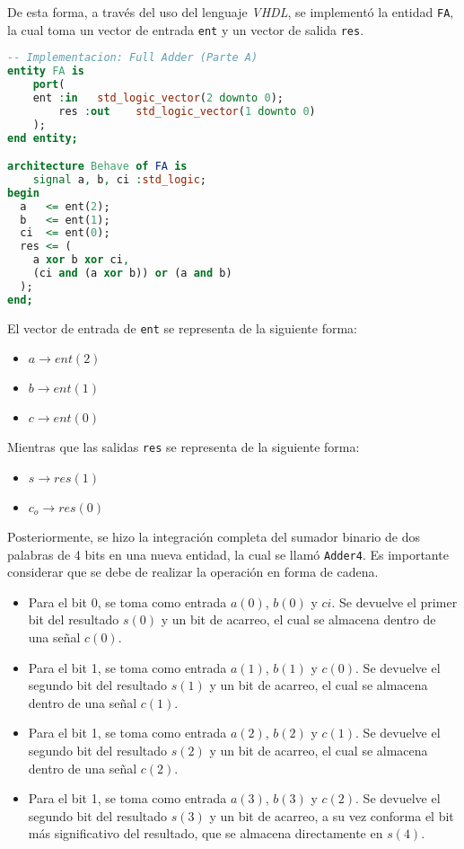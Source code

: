 \documentclass[../procedimientos.tex]{subfiles}
\begin{document}
De esta forma, a través del uso del lenguaje \textit{VHDL}, se implementó la 
entidad \texttt{FA}, la cual toma un vector de entrada \texttt{ent} y un 
vector de salida \texttt{res}.

\begin{lstlisting}[language=VHDL]
-- Implementacion: Full Adder (Parte A)
entity FA is
	port(
    ent	:in	  std_logic_vector(2 downto 0);
		res	:out	std_logic_vector(1 downto 0)
	);
end entity;

architecture Behave of FA is
	signal a, b, ci	:std_logic;
begin
  a   <= ent(2);
  b   <= ent(1);
  ci  <= ent(0);
  res <= (
    a xor b xor ci,
    (ci and (a xor b)) or (a and b)
  );
end;
\end{lstlisting}

El vector de entrada de \texttt{ent} se representa de la siguiente forma:
\begin{itemize}
  \item $a \rightarrow ent(2)$
  \item $b \rightarrow ent(1)$
  \item $c \rightarrow ent(0)$
\end{itemize}

Mientras que las salidas \texttt{res} se representa de la siguiente forma:
\begin{itemize}
  \item $s \rightarrow res(1)$
  \item $c_o \rightarrow res(0)$
\end{itemize}

Posteriormente, se hizo la integración completa del sumador binario de dos 
palabras de 4 bits en una nueva entidad, la cual se llamó \texttt{Adder4}. Es 
importante considerar que se debe de realizar la operación en forma de cadena.
\begin{itemize}
  \item Para el bit 0, se toma como entrada $a(0)$, $b(0)$ y $ci$. Se devuelve 
    el primer bit del resultado $s(0)$ y un bit de acarreo, el cual se 
    almacena dentro de una señal $c(0)$.
  \item Para el bit 1, se toma como entrada $a(1)$, $b(1)$ y $c(0)$. Se 
    devuelve el segundo bit del resultado $s(1)$ y un bit de acarreo, el cual 
    se almacena dentro de una señal $c(1)$.
  \item Para el bit 1, se toma como entrada $a(2)$, $b(2)$ y $c(1)$. Se 
    devuelve el segundo bit del resultado $s(2)$ y un bit de acarreo, el cual 
    se almacena dentro de una señal $c(2)$.
  \item Para el bit 1, se toma como entrada $a(3)$, $b(3)$ y $c(2)$. Se 
    devuelve el segundo bit del resultado $s(3)$ y un bit de acarreo, a su vez 
    conforma el bit más significativo del resultado, que se almacena 
    directamente en $s(4)$.
\end{itemize}
\end{document}
